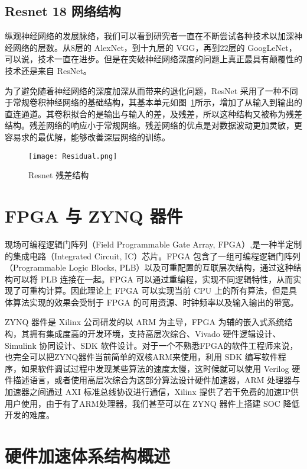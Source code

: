 \subsection{Resnet 18 网络结构}

纵观神经网络的发展脉络，我们可以看到研究者一直在不断尝试各种技术以加深神经网络的层数。从8层的 AlexNet，到十九层的 VGG，再到22层的 GoogLeNet，可以说，技术一直在进步。但是在突破神经网络深度的问题上真正最具有颠覆性的技术还是来自 ResNet。

为了避免随着神经网络的深度加深从而带来的退化问题，ResNet 采用了一种不同于常规卷积神经网络的基础结构，其基本单元如图~\ref{fig:Residual}所示，增加了从输入到输出的直连通道。其卷积拟合的是输出与输入的差，及残差，所以这种结构又被称为残差结构。残差网络的响应小于常规网络\citep{DBLP:journals/corr/HeZRS15}。残差网络的优点是对数据波动更加灵敏，更容易求的最优解，能够改善深层网络的训练。

\begin{figure}[!htbp]
    \centering
    \texttt{[image: Residual.png]}
    \caption{Resnet 残差结构}
    \label{fig:Residual}
\end{figure}


\section{FPGA 与 ZYNQ 器件}

现场可编程逻辑门阵列（Field Programmable Gate Array, FPGA）,是一种半定制的集成电路（Integrated Circuit, IC）芯片。FPGA 包含了一组可编程逻辑门阵列（Programmable Logic Blocks, PLB）以及可重配置的互联层次结构，通过这种结构可以将 PLB 连接在一起。FPGA 可以通过重编程，实现不同逻辑特性，从而实现了可重构计算。因此理论上 FPGA 可以实现当前 CPU 上的所有算法，但是具体算法实现的效果会受制于 FPGA 的可用资源、时钟频率以及输入输出的带宽。

ZYNQ 器件是 Xilinx 公司研发的以 ARM 为主导，FPGA 为辅的嵌入式系统结构，其拥有集成度高的开发环境，支持高层次综合、Vivado 硬件逻辑设计、Simulink 协同设计、SDK 软件设计。对于一个不熟悉FPGA的软件工程师来说，也完全可以把ZYNQ器件当前简单的双核ARM来使用，利用 SDK 编写软件程序，如果软件调试过程中发现某些算法的速度太慢，这时候就可以使用 Verilog 硬件描述语言，或者使用高层次综合为这部分算法设计硬件加速器，ARM 处理器与加速器之间通过 AXI 标准总线协议进行通信，Xilinx 提供了若干免费的加速IP供用户使用，由于有了ARM处理器，我们甚至可以在 ZYNQ 器件上搭建 SOC 降低开发的难度。

\section{硬件加速体系结构概述}

